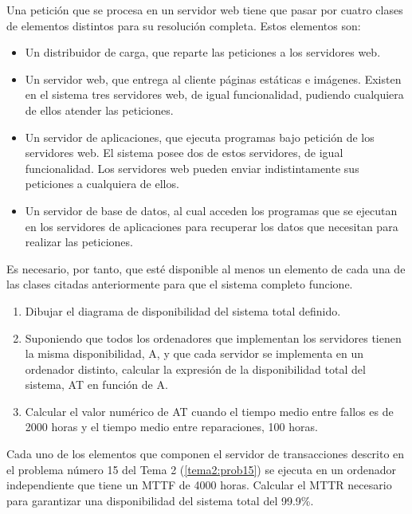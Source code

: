 \begin{problem}[7]
Una petición que se procesa en un servidor web tiene que pasar por
cuatro clases de elementos distintos para su resolución completa. Estos
elementos son:
  \begin{itemize}
    	\item Un distribuidor de carga, que reparte las peticiones a los servidores web.
    	\item Un servidor web, que entrega al cliente páginas estáticas e
imágenes. Existen en el sistema tres servidores web, de igual
funcionalidad, pudiendo cualquiera de ellos atender las peticiones.
    	\item Un servidor de aplicaciones, que ejecuta programas bajo petición
 de los servidores web. El sistema posee dos de estos servidores, de
igual funcionalidad. Los servidores web pueden enviar indistintamente
sus peticiones a cualquiera de ellos.
    	\item Un servidor de base de datos, al cual acceden los programas que
se ejecutan en los servidores de aplicaciones para recuperar los datos
que necesitan para realizar las peticiones.
  \end{itemize}


  Es necesario, por tanto, que esté disponible al menos un elemento
de cada una de las clases citadas anteriormente para que el sistema
completo funcione.
  \begin{enumerate}
    	\item Dibujar el diagrama de disponibilidad del sistema total definido.
    	\item Suponiendo que todos los ordenadores que implementan los
servidores tienen la misma disponibilidad, A, y que cada servidor se
implementa en un ordenador distinto, calcular la expresión de la
disponibilidad total del sistema, AT en función de A.
    	\item Calcular el valor numérico de AT cuando el tiempo medio entre
fallos es de 2000 horas y el tiempo medio entre reparaciones, 100 horas.
  \end{enumerate}

\solution



\end{problem}

\begin{problem}[8]
Cada uno de los elementos que componen el servidor de transacciones descrito en el problema número 15 del Tema 2 (\ref{tema2:prob15}) se ejecuta en un ordenador independiente que tiene un MTTF de 4000
horas. Calcular el MTTR necesario para garantizar una disponibilidad del sistema total del 99.9\%.

\solution



\end{problem}

